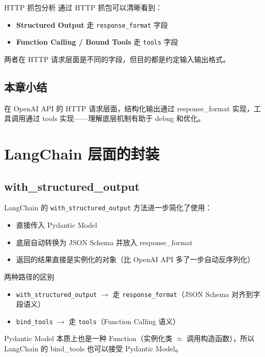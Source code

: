 \documentclass[a4paper]{article}
\begin{document}
\begin{knowledgebox}{HTTP 抓包分析}
通过 HTTP 抓包可以清晰看到：
\begin{itemize}
    \item \textbf{Structured Output} 走 \texttt{response\_format} 字段
    \item \textbf{Function Calling / Bound Tools} 走 \texttt{tools} 字段
\end{itemize}
两者在 HTTP 请求层面是不同的字段，但目的都是约定输入输出格式。
\end{knowledgebox}

\subsection{本章小结}

在 OpenAI API 的 HTTP 请求层面，结构化输出通过 response\_format 实现，工具调用通过 tools 实现——理解底层机制有助于 debug 和优化。

\section{LangChain 层面的封装}

\subsection{with\_structured\_output}

LangChain 的 \texttt{with\_structured\_output} 方法进一步简化了使用：

\begin{itemize}
    \item 直接传入 Pydantic Model
    \item 底层自动转换为 JSON Schema 并放入 response\_format
    \item 返回的结果直接是实例化的对象（比 OpenAI API 多了一步自动反序列化）
\end{itemize}

\begin{warningbox}{两种路径的区别}
\begin{itemize}
    \item \texttt{with\_structured\_output} $\rightarrow$ 走 \texttt{response\_format}（JSON Schema 对齐到字段语义）
    \item \texttt{bind\_tools} $\rightarrow$ 走 \texttt{tools}（Function Calling 语义）
\end{itemize}
Pydantic Model 本质上也是一种 Function（实例化类 $\approx$ 调用构造函数），所以 LangChain 的 bind\_tools 也可以接受 Pydantic Model。
\end{warningbox}
\end{document}
